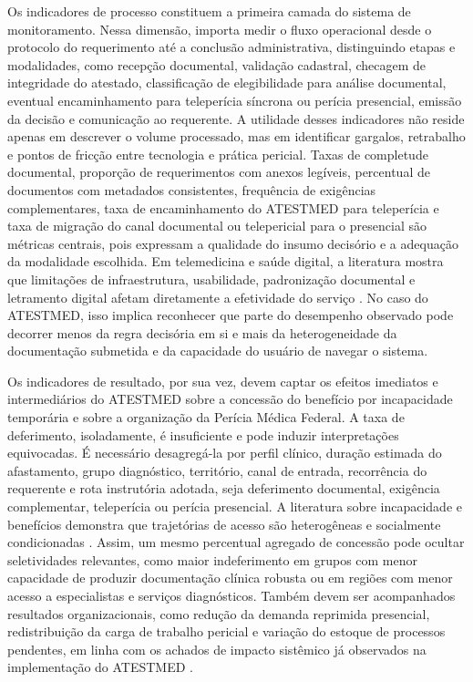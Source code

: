\documentclass[12pt,a4paper]{article}
\begin{document}
Os indicadores de processo constituem a primeira camada do sistema de monitoramento. Nessa dimensão, importa medir o fluxo operacional desde o protocolo do requerimento até a conclusão administrativa, distinguindo etapas e modalidades, como recepção documental, validação cadastral, checagem de integridade do atestado, classificação de elegibilidade para análise documental, eventual encaminhamento para teleperícia síncrona ou perícia presencial, emissão da decisão e comunicação ao requerente. A utilidade desses indicadores não reside apenas em descrever o volume processado, mas em identificar gargalos, retrabalho e pontos de fricção entre tecnologia e prática pericial. Taxas de completude documental, proporção de requerimentos com anexos legíveis, percentual de documentos com metadados consistentes, frequência de exigências complementares, taxa de encaminhamento do ATESTMED para teleperícia e taxa de migração do canal documental ou telepericial para o presencial são métricas centrais, pois expressam a qualidade do insumo decisório e a adequação da modalidade escolhida. Em telemedicina e saúde digital, a literatura mostra que limitações de infraestrutura, usabilidade, padronização documental e letramento digital afetam diretamente a efetividade do serviço \parencite{ftouni2022challengesoftelemedicineduringthecovid19pandemica, albasheer2026telemedicineutilizationanddigitalinclusionamongpe}. No caso do ATESTMED, isso implica reconhecer que parte do desempenho observado pode decorrer menos da regra decisória em si e mais da heterogeneidade da documentação submetida e da capacidade do usuário de navegar o sistema.

Os indicadores de resultado, por sua vez, devem captar os efeitos imediatos e intermediários do ATESTMED sobre a concessão do benefício por incapacidade temporária e sobre a organização da Perícia Médica Federal. A taxa de deferimento, isoladamente, é insuficiente e pode induzir interpretações equivocadas. É necessário desagregá-la por perfil clínico, duração estimada do afastamento, grupo diagnóstico, território, canal de entrada, recorrência do requerente e rota instrutória adotada, seja deferimento documental, exigência complementar, teleperícia ou perícia presencial. A literatura sobre incapacidade e benefícios demonstra que trajetórias de acesso são heterogêneas e socialmente condicionadas \parencite{sainsbury2006routesontoincapacitybenefitsfindingsfromqualitati, corden2001incapacitybenefitsandworkincentives, nogueira20200731t0100000100aavaliacaodadeficiencianatraje}. Assim, um mesmo percentual agregado de concessão pode ocultar seletividades relevantes, como maior indeferimento em grupos com menor capacidade de produzir documentação clínica robusta ou em regiões com menor acesso a especialistas e serviços diagnósticos. Também devem ser acompanhados resultados organizacionais, como redução da demanda reprimida presencial, redistribuição da carga de trabalho pericial e variação do estoque de processos pendentes, em linha com os achados de impacto sistêmico já observados na implementação do ATESTMED \parencite{soares20241031t0000000000asistematicadoatestmednaconcessa}.
\end{document}
